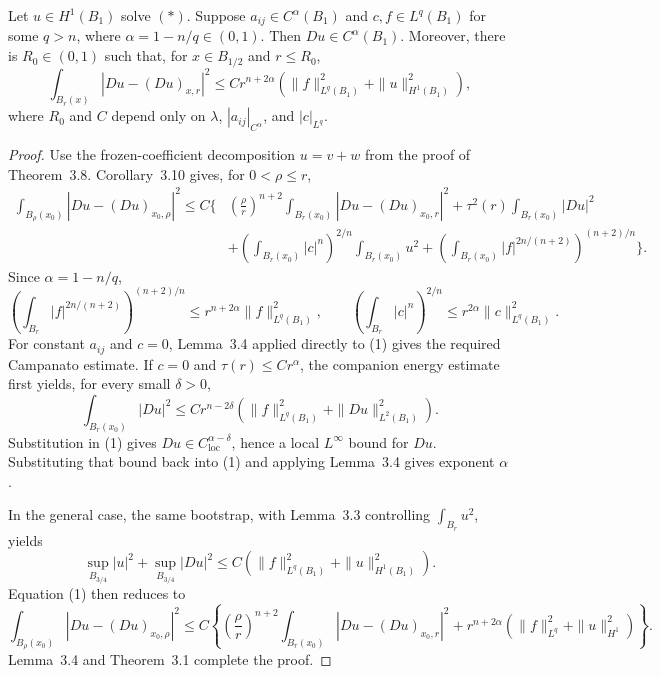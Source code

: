 \begin{theorem}\label{hanlin:weaksol-part1-grad-holder}
Let $u\in H^1(B_1)$ solve $(\ast)$. Suppose
$a_{ij}\in C^\alpha(B_1)$ and $c,f\in L^q(B_1)$ for some $q>n$, where
$\alpha=1-n/q\in(0,1)$. Then $Du\in C^\alpha(B_1)$. Moreover, there is
$R_0\in(0,1)$ such that, for $x\in B_{1/2}$ and $r\leq R_0$,
\[
\int_{B_r(x)}|Du-(Du)_{x,r}|^2
\leq Cr^{n+2\alpha}
\left(\|f\|_{L^q(B_1)}^2+\|u\|_{H^1(B_1)}^2\right),
\]
where $R_0$ and $C$ depend only on $\lambda$,
$|a_{ij}|_{C^\alpha}$, and $|c|_{L^q}$.
\end{theorem}
\begin{proof}
\sketch Use the frozen-coefficient decomposition $u=v+w$ from the proof of
Theorem~3.8. Corollary~3.10 gives, for $0<\rho\leq r$,
\[
\begin{aligned}
\int_{B_\rho(x_0)}|Du-(Du)_{x_0,\rho}|^2
\leq C\biggl\{&
\left(\frac\rho r\right)^{n+2}
\int_{B_r(x_0)}|Du-(Du)_{x_0,r}|^2
+\tau^2(r)\int_{B_r(x_0)}|Du|^2\\
&+\left(\int_{B_r(x_0)}|c|^n\right)^{2/n}
\int_{B_r(x_0)}u^2
+\left(\int_{B_r(x_0)}|f|^{2n/(n+2)}\right)^{(n+2)/n}
\biggr\}.
\tag{1}
\end{aligned}
\]
Since $\alpha=1-n/q$,
\[
\left(\int_{B_r}|f|^{2n/(n+2)}\right)^{(n+2)/n}
\leq r^{n+2\alpha}\|f\|_{L^q(B_1)}^2,
\qquad
\left(\int_{B_r}|c|^n\right)^{2/n}
\leq r^{2\alpha}\|c\|_{L^q(B_1)}^2.
\]
For constant $a_{ij}$ and $c=0$, Lemma~3.4 applied directly to (1) gives
the required Campanato estimate. If $c=0$ and
$\tau(r)\leq Cr^\alpha$, the companion energy estimate first yields, for
every small $\delta>0$,
\[
\int_{B_r(x_0)}|Du|^2
\leq Cr^{n-2\delta}
\left(\|f\|_{L^q(B_1)}^2+\|Du\|_{L^2(B_1)}^2\right).
\]
Substitution in (1) gives $Du\in C^{\alpha-\delta}_{\mathrm{loc}}$, hence a
local $L^\infty$ bound for $Du$. Substituting that bound back into (1) and
applying Lemma~3.4 gives exponent $\alpha$.

In the general case, the same bootstrap, with Lemma~3.3 controlling
$\int_{B_r}u^2$, yields
\[
\sup_{B_{3/4}}|u|^2+\sup_{B_{3/4}}|Du|^2
\leq C\left(\|f\|_{L^q(B_1)}^2+\|u\|_{H^1(B_1)}^2\right).
\]
Equation (1) then reduces to
\[
\int_{B_\rho(x_0)}|Du-(Du)_{x_0,\rho}|^2
\leq C\left\{
\left(\frac\rho r\right)^{n+2}
\int_{B_r(x_0)}|Du-(Du)_{x_0,r}|^2
+r^{n+2\alpha}
\left(\|f\|_{L^q}^2+\|u\|_{H^1}^2\right)\right\}.
\]
Lemma~3.4 and Theorem~3.1 complete the proof.
\end{proof}

